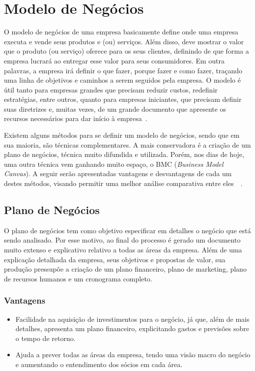 \chapter{Modelo de Negócios}

O modelo de negócios de uma empresa basicamente define onde uma empresa executa e vende seus produtos e (ou) serviços. Além disso, deve mostrar o valor que o produto (ou serviço) oferece para os seus clientes, definindo de que forma a empresa lucrará ao entregar esse valor para seus consumidores. Em outra palavras, a empresa irá definir o que fazer, porque fazer e como fazer, traçando uma linha de objetivos e caminhos a serem seguidos pela empresa. O modelo é útil tanto para empresas grandes que precisam reduzir custos, redefinir estratégias, entre outros, quanto para empresas iniciantes, que precisam definir suas diretrizes e, muitas vezes, de um grande documento que apresente os recursos necessários para dar início à empresa~\cite{modelo_de_negocios}.

Existem alguns métodos para se definir um modelo de negócios, sendo que em sua maioria, são técnicas complementares. A mais conservadora é a criação de um plano de negócios, técnica muito difundida e utilizada. Porém, nos dias de hoje, uma outra técnica vem ganhando muito espaço, o BMC (\textit{Business Model Canvas}).
A seguir serão apresentadas vantagens e desvantagens de cada um destes métodos, visando permitir uma melhor análise comparativa entre eles~\cite{comparabmcplanoum}~\cite{comparabmcplanodois}.

\section{Plano de Negócios}

O plano de negócios tem como objetivo especificar em detalhes o negócio que está sendo analisado. Por esse motivo, ao final do processo é gerado um documento muito extenso e explicativo relativo a todas as áreas da empresa. Além de uma explicação detalhada da empresa, seus objetivos e propostas de valor, sua produção pressupõe a criação de um plano financeiro, plano de marketing, plano de recursos humanos e um cronograma completo.

\subsection{Vantagens}

\begin{itemize}
\item Facilidade na aquisição de investimentos para o negócio, já que, além de mais detalhes, apresenta um plano financeiro, explicitando gastos e previsões sobre o tempo de retorno.
\item Ajuda a prever todas as áreas da empresa, tendo uma visão macro do negócio e aumentando o entendimento dos sócios em cada área.
\end{itemize}

